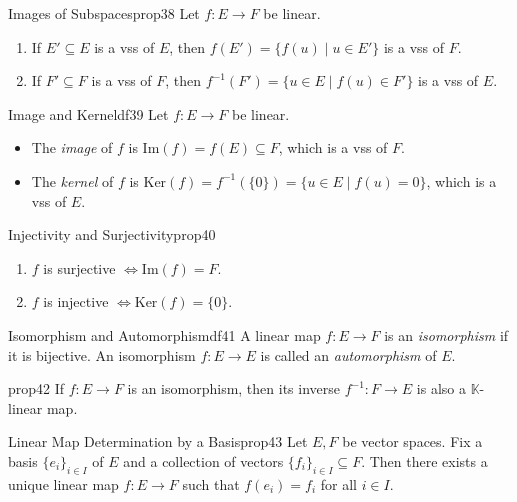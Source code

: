\documentclass[11pt, a4paper]{article}
\newcommand{\K}{\mathbb{K}}
\begin{document}
\begin{proposition}{Images of Subspaces}{prop38}
  Let $f: E \to F$ be linear.
  \begin{enumerate}
    \item If $E' \subseteq E$ is a vss of $E$, then $f(E') = \{f(u) \mid u \in E'\}$ is a vss of $F$.
    \item If $F' \subseteq F$ is a vss of $F$, then $f^{-1}(F') = \{u \in E \mid f(u) \in F'\}$ is a vss of $E$.
  \end{enumerate}
\end{proposition}

\begin{definition}{Image and Kernel}{df39}
  Let $f: E \to F$ be linear.
  \begin{itemize}
    \item The \emph{image} of $f$ is $\text{Im}(f) = f(E) \subseteq F$, which is a vss of $F$.
    \item The \emph{kernel} of $f$ is $\text{Ker}(f) = f^{-1}(\{0\}) = \{u \in E \mid f(u) = 0\}$, which is a vss of $E$.
  \end{itemize}
\end{definition}

\begin{proposition}{Injectivity and Surjectivity}{prop40}
  \begin{enumerate}
    \item $f$ is surjective $\iff \text{Im}(f) = F$.
    \item $f$ is injective $\iff \text{Ker}(f) = \{0\}$.
  \end{enumerate}
\end{proposition}

\begin{definition}{Isomorphism and Automorphism}{df41}
  A linear map $f: E \to F$ is an \emph{isomorphism} if it is bijective.
  An isomorphism $f: E \to E$ is called an \emph{automorphism} of $E$.
\end{definition}

\begin{proposition}{}{prop42}
  If $f: E \to F$ is an isomorphism, then its inverse $f^{-1}: F \to E$ is also a $\K$-linear map.
\end{proposition}

\begin{proposition}{Linear Map Determination by a Basis}{prop43}
  Let $E, F$ be vector spaces. Fix a basis $\{e_i\}_{i \in I}$ of $E$ and a collection of vectors $\{f_i\}_{i \in I} \subseteq F$.
  Then there exists a unique linear map $f: E \to F$ such that $f(e_i) = f_i$ for all $i \in I$.
\end{proposition}
\end{document}
